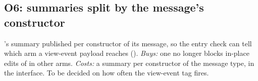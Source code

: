 \subsection*{O6: summaries split by the message's constructor}

's summary published per constructor of its message, so the entry check can tell which arm a
view-event payload reaches (). \emph{Buys:} one  no longer
blocks in-place edits of  in other arms. \emph{Costs:} a summary per constructor of the
message type, in the interface. To be decided on how often the view-event tag fires.
